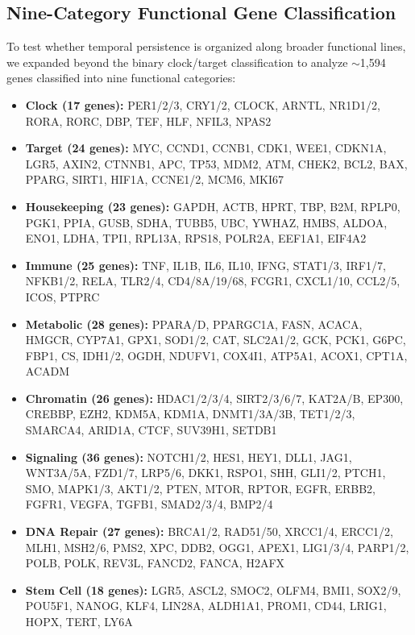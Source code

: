 \documentclass[11pt,a4paper]{article}
\begin{document}
\subsection{Nine-Category Functional Gene Classification}

To test whether temporal persistence is organized along broader functional lines, we expanded beyond the binary clock/target classification to analyze $\sim$1,594 genes classified into nine functional categories:

\begin{itemize}[noitemsep]
    \item \textbf{Clock (17 genes):} PER1/2/3, CRY1/2, CLOCK, ARNTL, NR1D1/2, RORA, RORC, DBP, TEF, HLF, NFIL3, NPAS2
    \item \textbf{Target (24 genes):} MYC, CCND1, CCNB1, CDK1, WEE1, CDKN1A, LGR5, AXIN2, CTNNB1, APC, TP53, MDM2, ATM, CHEK2, BCL2, BAX, PPARG, SIRT1, HIF1A, CCNE1/2, MCM6, MKI67
    \item \textbf{Housekeeping (23 genes):} GAPDH, ACTB, HPRT, TBP, B2M, RPLP0, PGK1, PPIA, GUSB, SDHA, TUBB5, UBC, YWHAZ, HMBS, ALDOA, ENO1, LDHA, TPI1, RPL13A, RPS18, POLR2A, EEF1A1, EIF4A2
    \item \textbf{Immune (25 genes):} TNF, IL1B, IL6, IL10, IFNG, STAT1/3, IRF1/7, NFKB1/2, RELA, TLR2/4, CD4/8A/19/68, FCGR1, CXCL1/10, CCL2/5, ICOS, PTPRC
    \item \textbf{Metabolic (28 genes):} PPARA/D, PPARGC1A, FASN, ACACA, HMGCR, CYP7A1, GPX1, SOD1/2, CAT, SLC2A1/2, GCK, PCK1, G6PC, FBP1, CS, IDH1/2, OGDH, NDUFV1, COX4I1, ATP5A1, ACOX1, CPT1A, ACADM
    \item \textbf{Chromatin (26 genes):} HDAC1/2/3/4, SIRT2/3/6/7, KAT2A/B, EP300, CREBBP, EZH2, KDM5A, KDM1A, DNMT1/3A/3B, TET1/2/3, SMARCA4, ARID1A, CTCF, SUV39H1, SETDB1
    \item \textbf{Signaling (36 genes):} NOTCH1/2, HES1, HEY1, DLL1, JAG1, WNT3A/5A, FZD1/7, LRP5/6, DKK1, RSPO1, SHH, GLI1/2, PTCH1, SMO, MAPK1/3, AKT1/2, PTEN, MTOR, RPTOR, EGFR, ERBB2, FGFR1, VEGFA, TGFB1, SMAD2/3/4, BMP2/4
    \item \textbf{DNA Repair (27 genes):} BRCA1/2, RAD51/50, XRCC1/4, ERCC1/2, MLH1, MSH2/6, PMS2, XPC, DDB2, OGG1, APEX1, LIG1/3/4, PARP1/2, POLB, POLK, REV3L, FANCD2, FANCA, H2AFX
    \item \textbf{Stem Cell (18 genes):} LGR5, ASCL2, SMOC2, OLFM4, BMI1, SOX2/9, POU5F1, NANOG, KLF4, LIN28A, ALDH1A1, PROM1, CD44, LRIG1, HOPX, TERT, LY6A
\end{itemize}
\end{document}
